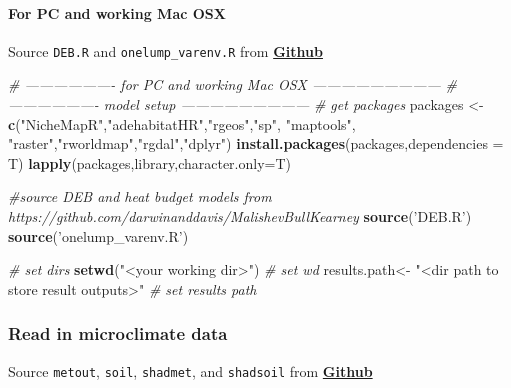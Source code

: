 \documentclass[]{article}
\newenvironment{Shaded}{\begin{snugshade}}{\end{snugshade}}
\newcommand{\KeywordTok}[1]{\textcolor[rgb]{0.13,0.29,0.53}{\textbf{#1}}}
\newcommand{\DataTypeTok}[1]{\textcolor[rgb]{0.13,0.29,0.53}{#1}}
\newcommand{\StringTok}[1]{\textcolor[rgb]{0.31,0.60,0.02}{#1}}
\newcommand{\CommentTok}[1]{\textcolor[rgb]{0.56,0.35,0.01}{\textit{#1}}}
\newcommand{\NormalTok}[1]{#1}
\let\oldparagraph\paragraph
\renewcommand{\paragraph}[1]{\oldparagraph{#1}\mbox{}}
\begin{document}
\paragraph{For PC and working Mac OSX}\label{for-pc-and-working-mac-osx}

Source \texttt{DEB.R} and \texttt{onelump\_varenv.R} from
\href{\%22https://github.com/darwinanddavis/MalishevBullKearney\%22}{\textbf{Github}}

\begin{Shaded}
\begin{Highlighting}[]
\CommentTok{# ------------------- for PC and working Mac OSX ---------------------------}
\CommentTok{# ------------------- model setup ---------------------------}
\CommentTok{# get packages}
\NormalTok{packages <-}\StringTok{ }\KeywordTok{c}\NormalTok{(}\StringTok{"NicheMapR"}\NormalTok{,}\StringTok{"adehabitatHR"}\NormalTok{,}\StringTok{"rgeos"}\NormalTok{,}\StringTok{"sp"}\NormalTok{, }\StringTok{"maptools"}\NormalTok{, }\StringTok{"raster"}\NormalTok{,}\StringTok{"rworldmap"}\NormalTok{,}\StringTok{"rgdal"}\NormalTok{,}\StringTok{"dplyr"}\NormalTok{)}
\KeywordTok{install.packages}\NormalTok{(packages,}\DataTypeTok{dependencies =}\NormalTok{ T)}
\KeywordTok{lapply}\NormalTok{(packages,library,}\DataTypeTok{character.only=}\NormalTok{T)}

\CommentTok{#source DEB and heat budget models from https://github.com/darwinanddavis/MalishevBullKearney}
\KeywordTok{source}\NormalTok{(}\StringTok{'DEB.R'}\NormalTok{)}
\KeywordTok{source}\NormalTok{(}\StringTok{'onelump_varenv.R'}\NormalTok{)}

\CommentTok{# set dirs}
\KeywordTok{setwd}\NormalTok{(}\StringTok{"<your working dir>"}\NormalTok{) }\CommentTok{# set wd}
\NormalTok{results.path<-}\StringTok{ "<dir path to store result outputs>"} \CommentTok{# set results path}
\end{Highlighting}
\end{Shaded}

\subsubsection{Read in microclimate
data}\label{read-in-microclimate-data}

Source \texttt{metout}, \texttt{soil}, \texttt{shadmet}, and
\texttt{shadsoil} from
\href{\%22https://github.com/darwinanddavis/MalishevBullKearney\%22}{\textbf{Github}}
\end{document}
